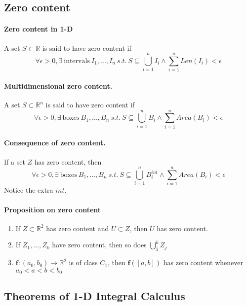 \documentclass[11pt]{article}
\newcommand{\real}[0]{\mathbb{R}}
\begin{document}
\subsection{Zero content}
\paragraph{Zero content in 1-D} A set $S\subset \real$ is said to have zero content if
\begin{equation*}
    \forall \epsilon > 0, \exists~\text{intervals}~I_1,...,I_n ~s.t.~ S\subseteq \bigcup_{i=1}^{n}I_i \wedge \sum_{i=1}^{n}{Len(I_i)} < \epsilon
\end{equation*}

\paragraph{Multidimensional zero content.} A set $S\subset \real^n$ is said to have zero content if
\begin{equation*}
    \forall \epsilon > 0, \exists~\text{boxes}~B_1,...,B_n~s.t.~S\subseteq \bigcup_{i=1}^{n}B_i \wedge \sum_{i=1}^{n}{Area(B_i)} < \epsilon
\end{equation*}

\paragraph{Consequence of zero content.}If a set $Z$ has zero content, then
\begin{equation*}
    \forall \epsilon>0, \exists~\text{boxes}~B_1,...,B_n~s.t.~ S\subseteq \bigcup_{i=1}^{n}B^{int}_i \wedge \sum_{i=1}^{n}{Area(B_i)} < \epsilon
\end{equation*}
Notice the extra $int$.

\paragraph{Proposition on zero content} 
\begin{enumerate}
    \item If $Z\subset \real^2$ has zero content and $U\subset Z$, then $U$ has zero content.
    \item If $Z_1,...,Z_k$ have zero content, then so does $\bigcup_1^k Z_j$
    \item $\mathbf{f}:(a_0, b_0) \xrightarrow{} \real^2$ is of class $C_1$, then $\mathbf{f}([a,b])$ has zero content whenever $a_0<a<b<b_0$
\end{enumerate}
\subsection{Theorems of 1-D Integral Calculus}
\end{document}
